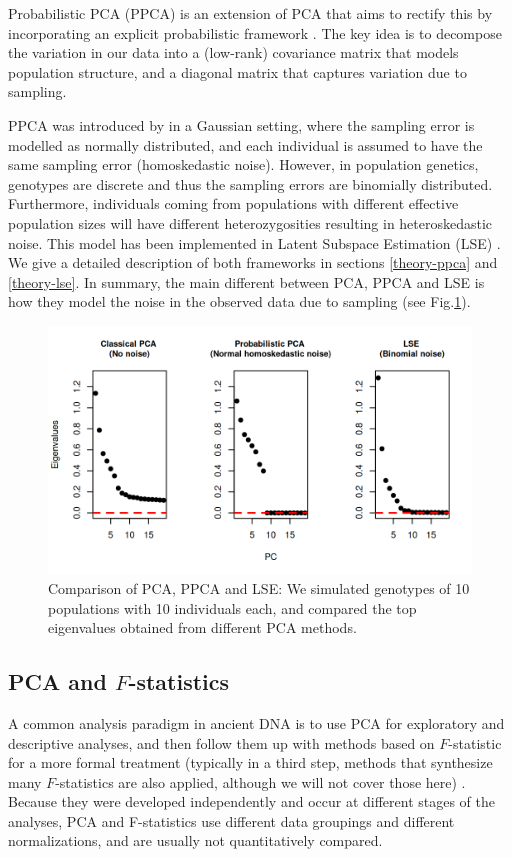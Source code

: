 \documentclass[12pt, letterpaper]{article}
\begin{document}
Probabilistic PCA (PPCA) is an extension of PCA that aims to rectify this by incorporating an explicit probabilistic framework \cite{tipping_probabilistic_nodate}.  
The key idea is to decompose the variation in our data into a (low-rank) covariance matrix that models population structure, and a diagonal matrix that captures variation due to sampling.

PPCA was introduced by \cite{tipping_probabilistic_nodate} in a Gaussian setting, where the sampling error is modelled as normally distributed, and each individual is assumed to have the same sampling error (homoskedastic noise). However, in population genetics, genotypes are discrete and thus the sampling errors are binomially distributed. Furthermore, individuals coming from populations with different effective population sizes will have different heterozygosities resulting in heteroskedastic noise. This model has been implemented in Latent Subspace Estimation (LSE) \cite{chen_consistent_2015, van_waaij_evaluation_2023, cabreros_likelihood-free_2019}. We give a detailed description of both frameworks in sections \ref{theory-ppca} and \ref{theory-lse}. In summary, the main different between PCA, PPCA and LSE is how they model the noise in the observed data due to sampling (see Fig.\ref{fig1:pca_ppca}). 

\begin{figure}[ht!]
    \includegraphics[width=16.5cm]{plots/pca_all_genetic.png}
    \centering
    \caption{Comparison of PCA, PPCA and LSE: We simulated genotypes of 10 populations with 10 individuals each, and compared the top eigenvalues obtained from different PCA methods.}
    \label{fig1:pca_ppca} 
\end{figure}

\subsection{PCA and $F$-statistics}
A common analysis paradigm in ancient DNA is to use PCA for exploratory and descriptive analyses, and then follow them up with methods based on $F$-statistic for a more formal treatment (typically in a third step, methods that synthesize many $F$-statistics are also applied, although we will not cover those here) \citep{orlando_ancient_2021}. Because they were developed independently and occur at different stages of the analyses, PCA and F-statistics use different data groupings and different normalizations, and are usually not quantitatively compared. 
\end{document}

